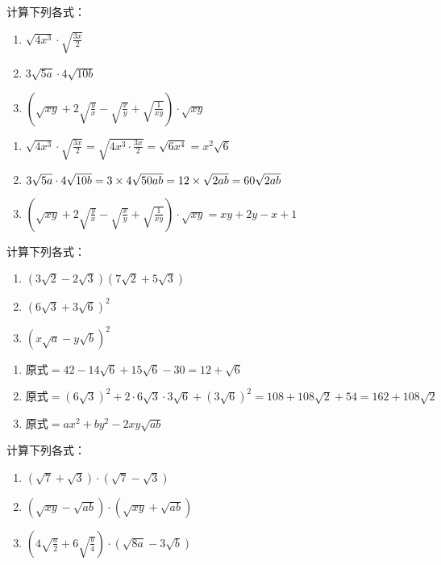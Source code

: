\begin{example}
    计算下列各式：
\begin{enumerate}
    \item $\sqrt{4x^3}\cdot \sqrt{\frac{3x}{2}}$
    \item $3\sqrt{5a}\cdot 4\sqrt{10b}$
\item $\left(\sqrt{xy}+2\sqrt{\frac{y}{x}}-\sqrt{\frac{x}{y}}+\sqrt{\frac{1}{xy}}\right)\cdot \sqrt{xy}$
\end{enumerate}
\end{example}

\begin{solution}
    \begin{enumerate}
        \item $\sqrt{4x^3}\cdot \sqrt{\frac{3x}{2}}=\sqrt{4x^3\cdot \frac{3x}{2}}=\sqrt{6x^4}=x^2\sqrt{6}$
        \item $3\sqrt{5a}\cdot 4\sqrt{10b}=3\times 4\sqrt{50ab}=12\times \sqrt{2ab}=60\sqrt{2ab}$
    \item $\left(\sqrt{xy}+2\sqrt{\frac{y}{x}}-\sqrt{\frac{x}{y}}+\sqrt{\frac{1}{xy}}\right)\cdot \sqrt{xy}=xy+2y-x+1$
    \end{enumerate}
\end{solution}


\begin{example}
    计算下列各式：
\begin{enumerate}
    \item $\left(3\sqrt{2}-2\sqrt{3}\right)\left(7\sqrt{2}+5\sqrt{3}\right)$
    \item $\left(6\sqrt{3}+3\sqrt{6}\right)^2$
    \item $\left(x\sqrt{a}-y\sqrt{b}\right)^2$
\end{enumerate}
\end{example}

\begin{solution}
    \begin{enumerate}
    \item $\text{原式}=42-14\sqrt{6}+15\sqrt{6}-30=12+\sqrt{6}$
    \item $\text{原式}=\left(6\sqrt{3}\right)^2+2\cdot 6\sqrt{3}\cdot 3\sqrt{6}+\left(3\sqrt{6}\right)^2=108+108\sqrt{2}+54=162+108\sqrt{2}$
    \item $\text{原式}=ax^2+by^2-2xy\sqrt{ab}$
\end{enumerate}
\end{solution}


\begin{example}
    计算下列各式：
\begin{multicols}{2}
    \begin{enumerate}
    \item $\left(\sqrt{7}+\sqrt{3}\right)\cdot \left(\sqrt{7}-\sqrt{3}\right)$
    \item $\left(\sqrt{xy}-\sqrt{ab}\right)\cdot \left(\sqrt{xy}+\sqrt{ab}\right)$
    \item $\left(4\sqrt{\frac{a}{2}}+6\sqrt{\frac{b}{4}}\right)\cdot \left(\sqrt{8a}-3\sqrt{b}\right)$
\end{enumerate}
\end{multicols}
\end{example}

